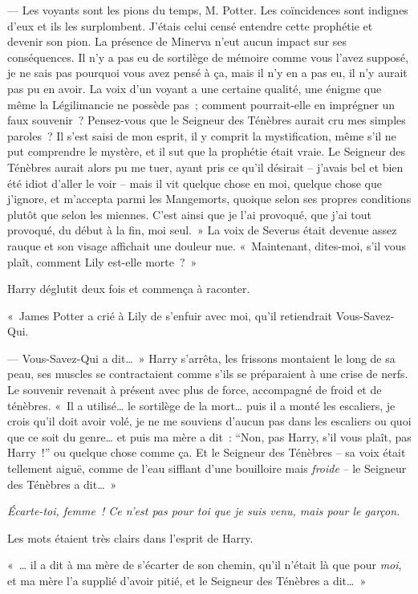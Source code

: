 --- Les voyants sont les pions du temps, M. Potter.
Les coïncidences sont indignes d'eux et ils les surplombent.
J'étais celui censé entendre cette prophétie et devenir son pion.
La présence de Minerva n'eut aucun impact sur ses conséquences.
Il n'y a pas eu de sortilège de mémoire comme vous l'avez supposé, je ne sais pas pourquoi vous avez pensé à ça, mais il n'y en a pas eu, il n'y aurait pas pu en avoir.
La voix d'un voyant a une certaine qualité, une énigme que même la Légilimancie ne possède pas~; comment pourrait-elle en imprégner un faux souvenir~?
Pensez-vous que le Seigneur des Ténèbres aurait cru mes simples paroles~?
Il s'est saisi de mon esprit, il y comprit la mystification, même s'il ne put comprendre le mystère, et il sut que la prophétie était vraie.
Le Seigneur des Ténèbres aurait alors pu me tuer, ayant pris ce qu'il désirait -- j'avais bel et bien été idiot d'aller le voir -- mais il vit quelque chose en moi, quelque chose que j'ignore, et m'accepta parmi les Mangemorts, quoique selon ses propres conditions plutôt que selon les miennes.
C'est ainsi que je l'ai provoqué, que j'ai tout provoqué, du début à la fin, moi seul.~»
La voix de Severus était devenue assez rauque et son visage affichait une douleur nue.
«~Maintenant, dites-moi, s'il vous plaît, comment Lily est-elle morte~?~»

Harry déglutit deux fois et commença à raconter.

«~James Potter a crié à Lily de s'enfuir avec moi, qu'il retiendrait Vous-Savez-Qui.

--- Vous-Savez-Qui a dit…~»
Harry s'arrêta, les frissons montaient le long de sa peau, ses muscles se contractaient comme s'ils se préparaient à une crise de nerfs.
Le souvenir revenait à présent avec plus de force, accompagné de froid et de ténèbres.
«~Il a utilisé… le sortilège de la mort… puis il a monté les escaliers, je crois qu'il doit avoir volé, je ne me souviens d'aucun pas dans les escaliers ou quoi que ce soit du genre… et puis ma mère a dit~: “Non, pas Harry, s'il vous plaît, pas Harry~!” ou quelque chose comme ça.
Et le Seigneur des Ténèbres -- sa voix était tellement aiguë, comme de l'eau sifflant d'une bouilloire mais \emph{froide} -- le Seigneur des Ténèbres a dit…~»

\emph{Écarte-toi, femme~!
Ce n'est pas pour toi que je suis venu, mais pour le garçon.}

Les mots étaient très clairs dans l'esprit de Harry.

«~… il a dit à ma mère de s'écarter de son chemin, qu'il n'était là que pour \emph{moi}, et ma mère l'a supplié d'avoir pitié, et le Seigneur des Ténèbres a dit…~»


